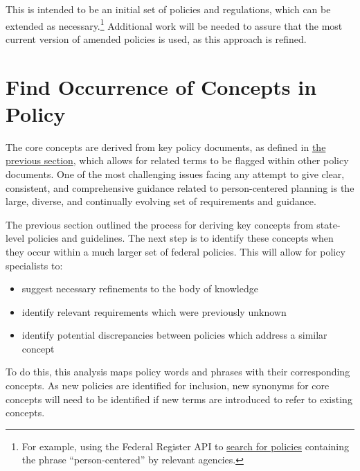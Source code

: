 \documentclass[
]{book}
\providecommand{\tightlist}{%
  \setlength{\itemsep}{0pt}\setlength{\parskip}{0pt}}
\begin{document}
This is intended to be an initial set of policies and regulations, which can be extended as necessary.\footnote{For example, using the Federal Register API to \href{https://www.federalregister.gov/documents/search?conditions\%5Bagencies\%5D\%5B\%5D=centers-for-medicare-medicaid-services\&conditions\%5Bagencies\%5D\%5B\%5D=health-and-human-services-department\&conditions\%5Bagencies\%5D\%5B\%5D=substance-abuse-and-mental-health-services-administration\&conditions\%5Bterm\%5D=person-centered\&conditions\%5Btype\%5D\%5B\%5D=RULE\#}{search for policies} containing the phrase ``person-centered'' by relevant agencies.} Additional work will be needed to assure that the most current version of amended policies is used, as this approach is refined.

\hypertarget{find-occurrence-of-concepts-in-policy}{%
\section{Find Occurrence of Concepts in Policy}\label{find-occurrence-of-concepts-in-policy}}

The core concepts are derived from key policy documents, as defined in \protect\hyperlink{bok}{the previous section}, which allows for related terms to be flagged within other policy documents. One of the most challenging issues facing any attempt to give clear, consistent, and comprehensive guidance related to person-centered planning is the large, diverse, and continually evolving set of requirements and guidance.

The previous section outlined the process for deriving key concepts from state-level policies and guidelines. The next step is to identify these concepts when they occur within a much larger set of federal policies. This will allow for policy specialists to:

\begin{itemize}
\tightlist
\item
  suggest necessary refinements to the body of knowledge
\item
  identify relevant requirements which were previously unknown
\item
  identify potential discrepancies between policies which address a similar concept
\end{itemize}

To do this, this analysis maps policy words and phrases with their corresponding concepts. As new policies are identified for inclusion, new synonyms for core concepts will need to be identified if new terms are introduced to refer to existing concepts.
\end{document}
